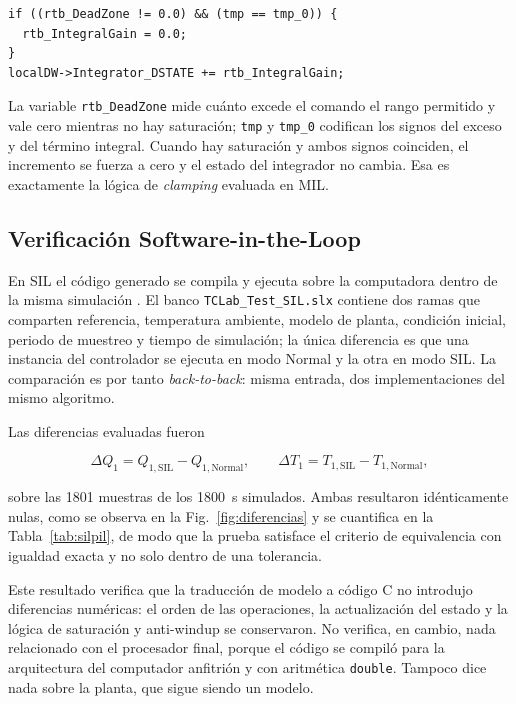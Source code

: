 \begin{lstlisting}
if ((rtb_DeadZone != 0.0) && (tmp == tmp_0)) {
  rtb_IntegralGain = 0.0;
}
localDW->Integrator_DSTATE += rtb_IntegralGain;
\end{lstlisting}

La variable \texttt{rtb\_DeadZone} mide cuánto excede el comando el rango permitido y vale cero
mientras no hay saturación; \texttt{tmp} y \texttt{tmp\_0} codifican los signos del exceso y del
término integral. Cuando hay saturación y ambos signos coinciden, el incremento se fuerza a cero y
el estado del integrador no cambia. Esa es exactamente la lógica de \emph{clamping} evaluada en
MIL.

\subsection{Verificación Software-in-the-Loop}

En SIL el código generado se compila y ejecuta sobre la computadora dentro de la misma simulación
\cite{mw_sil}. El banco \texttt{TCLab\_Test\_SIL.slx} contiene dos ramas que comparten referencia,
temperatura ambiente, modelo de planta, condición inicial, periodo de muestreo y tiempo de
simulación; la única diferencia es que una instancia del controlador se ejecuta en modo Normal y la
otra en modo SIL. La comparación es por tanto \emph{back-to-back}: misma entrada, dos
implementaciones del mismo algoritmo.

Las diferencias evaluadas fueron

\begin{equation}
\Delta Q_1 = Q_{1,\mathrm{SIL}} - Q_{1,\mathrm{Normal}},
\qquad
\Delta T_1 = T_{1,\mathrm{SIL}} - T_{1,\mathrm{Normal}},
\label{eq:difsil}
\end{equation}

sobre las \num{1801} muestras de los \SI{1800}{\second} simulados. Ambas resultaron idénticamente
nulas, como se observa en la Fig.~\ref{fig:diferencias} y se cuantifica en la
Tabla~\ref{tab:silpil}, de modo que la prueba satisface el criterio de equivalencia con igualdad
exacta y no solo dentro de una tolerancia.

Este resultado verifica que la traducción de modelo a código C no introdujo diferencias numéricas:
el orden de las operaciones, la actualización del estado y la lógica de saturación y anti-windup se
conservaron. No verifica, en cambio, nada relacionado con el procesador final, porque el código se
compiló para la arquitectura del computador anfitrión y con aritmética \texttt{double}. Tampoco
dice nada sobre la planta, que sigue siendo un modelo.
